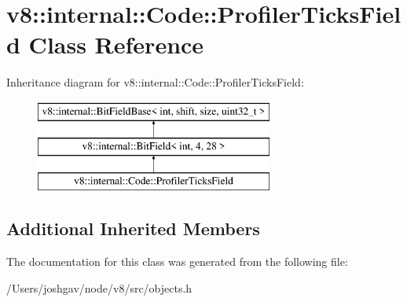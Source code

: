 \hypertarget{classv8_1_1internal_1_1_code_1_1_profiler_ticks_field}{}\section{v8\+:\+:internal\+:\+:Code\+:\+:Profiler\+Ticks\+Field Class Reference}
\label{classv8_1_1internal_1_1_code_1_1_profiler_ticks_field}
Inheritance diagram for v8\+:\+:internal\+:\+:Code\+:\+:Profiler\+Ticks\+Field\+:\begin{figure}[H]
\begin{center}
\leavevmode
\includegraphics[height=3.000000cm]{classv8_1_1internal_1_1_code_1_1_profiler_ticks_field}
\end{center}
\end{figure}
\subsection*{Additional Inherited Members}


The documentation for this class was generated from the following file\+:\begin{DoxyCompactItemize}
\item 
/\+Users/joshgav/node/v8/src/objects.\+h\end{DoxyCompactItemize}
